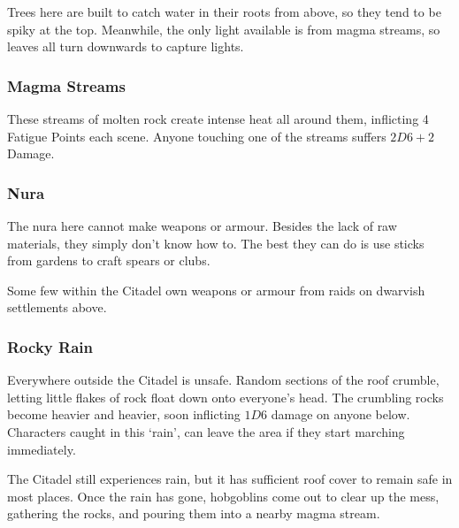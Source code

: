 \begin{multicols}{2}
Trees here are built to catch water in their roots from above, so they tend to be spiky at the top.  Meanwhile, the only light available is from magma streams, so leaves all turn downwards to capture lights.

\subsubsection{Magma Streams}

These streams of molten rock create intense heat all around them, inflicting 4 Fatigue Points each scene.
Anyone touching one of the streams suffers $2D6+2$ Damage.

\subsubsection{Nura}

The nura here cannot make weapons or armour.
Besides the lack of raw materials, they simply don't know how to.
The best they can do is use sticks from gardens to craft spears or clubs.

Some few within the Citadel own weapons or armour from raids on dwarvish settlements above.

\subsubsection{Rocky Rain}

Everywhere outside the Citadel is unsafe.
Random sections of the roof crumble, letting little flakes of rock float down onto everyone's head.
The crumbling rocks become heavier and heavier, soon inflicting $1D6$ damage on anyone below.
Characters caught in this `rain', can leave the area if they start marching immediately.

The Citadel still experiences rain, but it has sufficient roof cover to remain safe in most places.
Once the rain has gone, hobgoblins come out to clear up the mess, gathering the rocks, and pouring them into a nearby magma stream.

\end{multicols}

